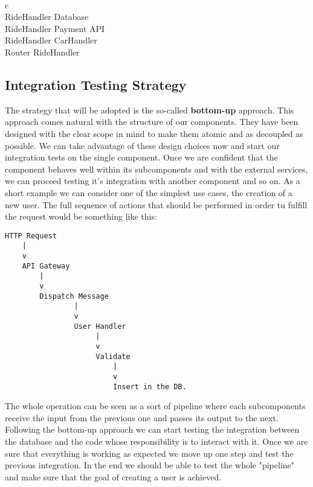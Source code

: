     \\
    \begin{tabular}{ c }
      \hline
       \\
      \hline
      RideHandler \rightarrow Database \\ \hline
      RideHandler \rightarrow Payment API \\ \hline
      RideHandler \rightarrow CarHandler \\ \hline
      Router \rightarrow RideHandler \\
      \hline
      \vspace{1mm}
    \end{tabular}

\subsection{Integration Testing Strategy}
The strategy that will be adopted is the so-called \textbf{bottom-up} approach.
This approach comes natural with the structure of our components. They have been
designed with the clear scope in mind to make them atomic and as decoupled as possible.
We can take advantage of these design choices now and start our integration tests
on the single component. Once we are confident that the component behaves
well within its subcomponents and with the external services, we can proceed testing
it's integration with another component and so on.
As a short example we can consider one of the simplest use cases, the creation of a new user.
The full sequence of actions that should be performed in order tu fulfill the request
would be something like this:
\lstset{basicstyle=\ttfamily\footnotesize,breaklines=true}
\begin{lstlisting}
HTTP Request
    |
    v
    API Gateway
        |
        v
        Dispatch Message
                |
                v 
                User Handler
                     |
                     v
                     Validate
                         |
                         v
                         Insert in the DB.
\end{lstlisting}
The whole operation can be seen as a sort of pipeline where each subcomponents
receive the input from the previous one and passes its output to the next.
Following the bottom-up approach we can start testing the integration between the
database and the code whose responsibility is to interact with it. Once we are sure
that everything is working as expected we move up one step and test the previous integration.
In the end we should be able to test the whole "pipeline" and make sure that the
goal of creating a user is achieved.

